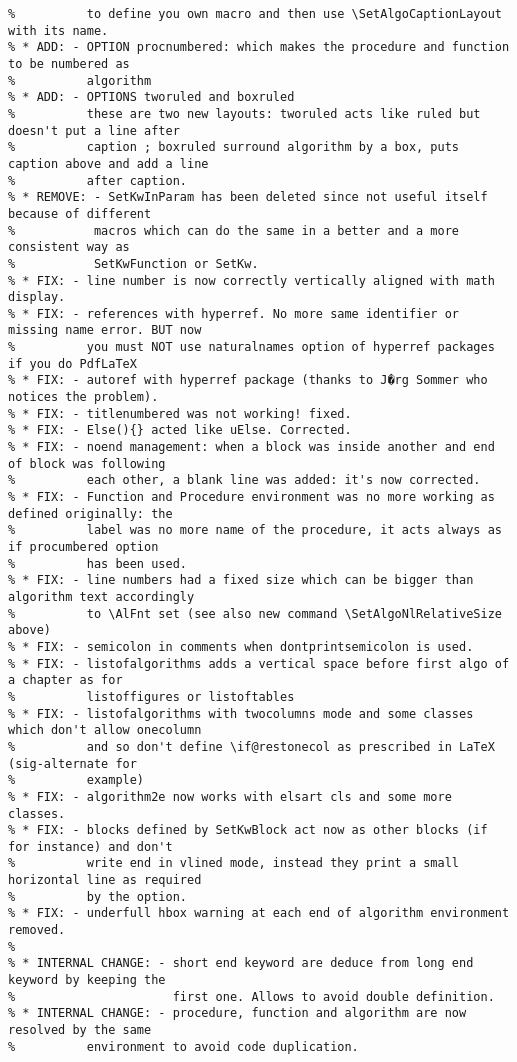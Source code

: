 \documentclass[a4paper]{article}
\begin{document}
\begin{verbatim}
%          to define you own macro and then use \SetAlgoCaptionLayout with its name.
% * ADD: - OPTION procnumbered: which makes the procedure and function to be numbered as
%          algorithm
% * ADD: - OPTIONS tworuled and boxruled
%          these are two new layouts: tworuled acts like ruled but doesn't put a line after
%          caption ; boxruled surround algorithm by a box, puts caption above and add a line
%          after caption.
% * REMOVE: - SetKwInParam has been deleted since not useful itself because of different
%           macros which can do the same in a better and a more consistent way as
%           SetKwFunction or SetKw.
% * FIX: - line number is now correctly vertically aligned with math display.
% * FIX: - references with hyperref. No more same identifier or missing name error. BUT now
%          you must NOT use naturalnames option of hyperref packages if you do PdfLaTeX
% * FIX: - autoref with hyperref package (thanks to J�rg Sommer who notices the problem).
% * FIX: - titlenumbered was not working! fixed.
% * FIX: - Else(){} acted like uElse. Corrected.
% * FIX: - noend management: when a block was inside another and end of block was following
%          each other, a blank line was added: it's now corrected.
% * FIX: - Function and Procedure environment was no more working as defined originally: the
%          label was no more name of the procedure, it acts always as if procumbered option
%          has been used.
% * FIX: - line numbers had a fixed size which can be bigger than algorithm text accordingly
%          to \AlFnt set (see also new command \SetAlgoNlRelativeSize above)
% * FIX: - semicolon in comments when dontprintsemicolon is used.
% * FIX: - listofalgorithms adds a vertical space before first algo of a chapter as for
%          listoffigures or listoftables
% * FIX: - listofalgorithms with twocolumns mode and some classes which don't allow onecolumn
%          and so don't define \if@restonecol as prescribed in LaTeX (sig-alternate for
%          example)
% * FIX: - algorithm2e now works with elsart cls and some more classes.
% * FIX: - blocks defined by SetKwBlock act now as other blocks (if for instance) and don't
%          write end in vlined mode, instead they print a small horizontal line as required
%          by the option.
% * FIX: - underfull hbox warning at each end of algorithm environment removed.
%
% * INTERNAL CHANGE: - short end keyword are deduce from long end keyword by keeping the
%                      first one. Allows to avoid double definition.
% * INTERNAL CHANGE: - procedure, function and algorithm are now resolved by the same
%          environment to avoid code duplication. 
\end{verbatim}

\clearpage
\listofalgorithms
\clearpage
\printindex
\end{document}
